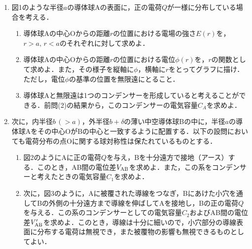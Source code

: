 \begin{enumerate}
  \setlength{\leftskip}{-1zw}
  \setlength{\itemindent}{1zw}\setlength{\labelsep}{0.5zw}
  \setlength{\labelwidth}{1zw}\setlength{\leftmargin}{1zw}
  \setlength{\itemsep}{0.5\baselineskip}
  \item 図1のような半径$a$の導体球Aの表面に，正の電荷$Q$が一様に分布している場合を考える．
  \begin{enumerate}[（1）]
    \setlength{\leftskip}{-2zw}
    \setlength{\itemindent}{1zw}\setlength{\labelsep}{1zw}
    \setlength{\labelwidth}{1zw}
    \item 導体球Aの中心Oからの距離$r$の位置における電場の強さ$E(r)$を，$r>a,\,r<a$のそれぞれに対して求めよ．
    \item 導体球Aの中心Oからの距離$r$の位置における電位$\phi (r)$を，$r$の関数として求めよ．また，その様子を縦軸に$\phi$，横軸に$r$をとってグラフに描け．ただし，電位$\phi$の基準の位置を無限遠にとること．
    \item 導体球Aと無限遠は1つのコンデンサーを形成していると考えることができる．前問(2)の結果から，このコンデンサーの電気容量$C_A$を求めよ．
  \end{enumerate}
  \item 次に，内半径$b\,(>a)$，外半径$b+\delta$の薄い中空導体球Bの中に，半径$a$の導体球Aをその中心OがBの中心と一致するように配置する．以下の設問においても電荷分布の点Oに関する球対称性は保たれているものとする．
  \begin{enumerate}[（1）]
    \setlength{\leftskip}{-2zw}
    \setlength{\itemindent}{1zw}\setlength{\labelsep}{1zw}
    \setlength{\labelwidth}{1zw}
    \item 図2のようにAに正の電荷$Q$を与え，Bを十分遠方で接地（アース）する．このとき，AB間の電位差$V_{\rm AB}$を求めよ．また，この系をコンデンサーと考えたときの電気容量$C_1$を求めよ．
    \item 次に，図3のように，Aに被覆された導線をつなぎ，Bにあけた小穴を通してBの外側の十分遠方まで導線を伸ばしてAを接地し，Bの正の電荷$Q$を与える．この系のコンデンサーとしての電気容量$C_2$およびAB間の電位差$V^\prime_{\rm AB}$を求めよ．このとき，導線は十分に細いので，小穴部分の導線表面に分布する電荷は無視でき，また被覆物の影響も無視できるものとしてよい．
  \end{enumerate}
\end{enumerate}

